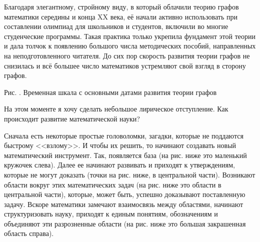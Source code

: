	Благодаря элегантному, стройному виду, в который облачили теорию графов математики середины и конца XX века, её начали активно использовать при составлении олимпиад для школьников и студентов, включили во многие студенческие программы. Такая практика только укрепила фундамент этой теории и дала толчок к появлению большого числа методических пособий, направленных на неподготовленного читателя. До сих пор скорость развития теории графов не снизилась и всё большее число математиков устремляют свой взгляд в сторону графов.
	

\begin{center}

	\small Рис. \images. Временная шкала с основными датами развития теории графов
\end{center}

	На этом моменте я хочу сделать небольшое лирическое отступление. Как происходит развитие математической науки?
	
	Сначала есть некоторые простые головоломки, загадки, которые не поддаются быстрому <<взлому>>. И чтобы их решить, то начинают создавать новый математический инструмент. Так, появляется база (на рис. ниже это маленький кружочек слева). Далее ее начинают развивать и приходят к утверждениям, которые не могут доказать (точки на рис. ниже, в центральной части). Возникают области вокруг этих математических задач (на рис. ниже это области в центральной части), которые, может быть, успешно доказывают поставленную задачу. Вскоре математики замечают взаимосвязь между областями, начинают структуризовать науку, приходят к единым понятиям, обозначениям и объединяют эти разрозненные области (на рис. ниже это большая закрашенная область справа).

